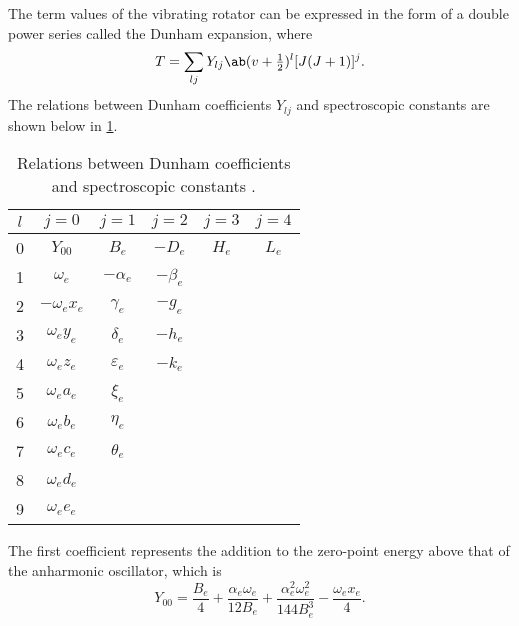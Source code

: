 The term values of the vibrating rotator can be expressed in the form of a double power series called the Dunham expansion, where \cite[109]{herzbergMolecularSpectraMolecular1950}
\begin{equation*}
    T = \sum_{lj}Y_{lj}\ab(v + \tfrac{1}{2})^l [J(J + 1)]^j.
\end{equation*}
The relations between Dunham coefficients $Y_{lj}$ and spectroscopic constants are shown below in \cref{t:dunham_coefficients}.
\begin{table}[H]
    \centering
    \caption{Relations between Dunham coefficients and spectroscopic constants \cite[419]{babouHighTemperatureNonequilibriumPartition2009}.}
    \label{t:dunham_coefficients}
    \begin{tabular}{c|ccccc}
        \toprule
        $l$ & $j = 0$            & $j = 1$           & $j = 2$      & $j = 3$ & $j = 4$ \\
        \midrule
        0   & $Y_{00}$           & $B_e$           & $-D_e$     & $H_e$ & $L_e$ \\
        1   & $\omega_e$       & $-\alpha_e$     & $-\beta_e$ &         &         \\
        2   & $-\omega_ex_e$ & $\gamma_e$      & $-g_e$     &         &         \\
        3   & $\omega_ey_e$  & $\delta_e$      & $-h_e$     &         &         \\
        4   & $\omega_ez_e$  & $\varepsilon_e$ & $-k_e$     &         &         \\
        5   & $\omega_ea_e$  & $\xi_e$         &              &         &         \\
        6   & $\omega_eb_e$  & $\eta_e$        &              &         &         \\
        7   & $\omega_ec_e$  & $\theta_e$      &              &         &         \\
        8   & $\omega_ed_e$  &                   &              &         &         \\
        9   & $\omega_ee_e$  &                   &              &         &         \\
        \bottomrule
    \end{tabular}
\end{table}
The first coefficient represents the addition to the zero-point energy above that of the anharmonic oscillator, which is \cite[109]{herzbergMolecularSpectraMolecular1950}
\begin{equation*}
    Y_{00} = \frac{B_e}{4} + \frac{\alpha_e\omega_e}{12B_e} + \frac{\alpha_e^2\omega_e^2}{144B_e^3} - \frac{\omega_ex_e}{4}.
\end{equation*}

